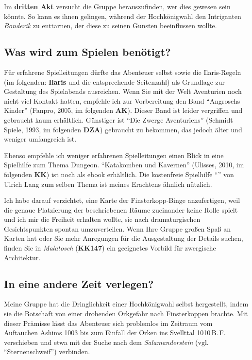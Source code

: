 Im \textbf{dritten Akt} versucht die Gruppe herauszufinden, wer dies gewesen sein könnte.
So kann es ihnen gelingen, während der Hochkönigwahl den Intriganten \emph{Bonderik} zu enttarnen, der diese zu seinen Gunsten beeinflussen wollte.

\subsection{Was wird zum Spielen benötigt?}
Für erfahrene Spielleitungen dürfte das Abenteuer selbst sowie die Ilaris-Regeln (im folgenden: \textbf{Ilaris} und die entsprechende Seitenzahl) als Grundlage zur Gestaltung des Spielabends ausreichen.
Wenn Sie mit der Welt Aventurien noch nicht viel Kontakt hatten, empfehle ich zur Vorbereitung den Band \enquote{Angroschs Kinder} (Fanpro, 2005, im folgenden \textbf{AK}).
Dieser Band ist leider vergriffen und gebraucht kaum erhältlich.
Günstiger ist \enquote{Die Zwerge Aventuriens} (Schmidt Spiele, 1993, im folgenden \textbf{DZA}) gebraucht zu bekommen, das jedoch älter und weniger umfangreich ist.

Ebenso empfehle ich weniger erfahrenen Spielleitungen einen Blick in eine Spielhilfe zum Thema Dungeon. \enquote{Katakomben und Kavernen} (Ulisses, 2010, im folgenden \textbf{KK})
ist noch als ebook erhältlich.
Die kostenfreie Spielhilfe \enquote{} von Ulrich Lang
zum selben Thema ist meines Erachtens ähnlich nützlich.

Ich habe darauf verzichtet, eine Karte der Finsterkopp-Binge anzufertigen, weil die genaue Platzierung der beschriebenen Räume zueinander keine Rolle spielt und ich mir die Freiheit erhalten wollte, sie nach dramaturgischen Gesichtspunkten spontan umzuverteilen. Wenn Ihre Gruppe großen Spaß an Karten hat oder Sie mehr Anregungen für die Ausgestaltung der Details suchen, finden Sie in \emph{Malatosch} (\textbf{KK147}) ein geeignetes Vorbild für zwergische Architektur.

\subsection{In eine andere Zeit verlegen?}
Meine Gruppe hat die Dringlichkeit einer Hochkönigwahl selbst hergestellt, indem sie die Botschaft von einer drohenden Orkgefahr nach Finsterkoppen brachte.
Mit dieser Prämisse lässt das Abenteuer sich problemlos im Zeitraum vom Auftauchen Ashims 1003 bis zum Einfall der Orken ins Svellttal 1010\,B.\,F. verschieben
und etwa mit der Suche nach dem  \emph{Salamanderstein} (vgl. \enquote{Sternenschweif}) verbinden.

